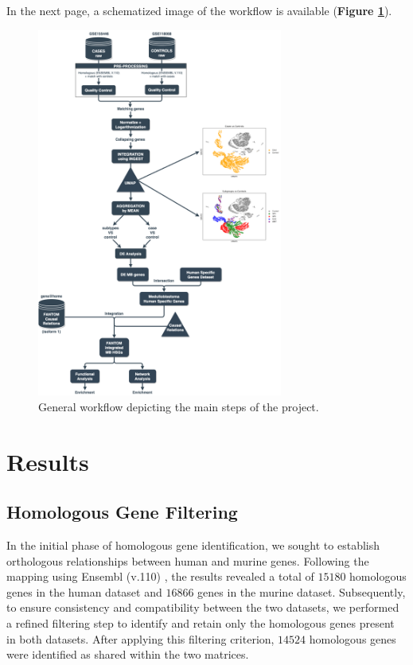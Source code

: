 \documentclass[10pt]{SelfArx} %
\begin{document}
In the next page, a schematized image of the workflow is available (\textbf{Figure \ref{fig:pipeline}}).

\newpage

\begin{figure}[h!]
    \centering
    \includegraphics[width=0.72\textwidth]{project-report/figures/pipeline.png}
    \caption{General workflow depicting the main steps of the project.}
    \label{fig:pipeline}    
\end{figure}

\newpage
\section{Results}\label{sec:results}
\subsection{Homologous Gene Filtering}\label{sec:homologous_results}
In the initial phase of homologous gene identification, we sought to establish orthologous relationships between human and murine genes. Following the mapping using Ensembl (v.110) \cite{biomart_ensembl110}, the results revealed a total of $15180$ homologous genes in the human dataset and $16866$ genes in the murine dataset.
Subsequently, to ensure consistency and compatibility between the two datasets, we performed a refined filtering step to identify and retain only the homologous genes present in both datasets. After applying this filtering criterion, $14524$ homologous genes were identified as shared within the two matrices. 
\end{document}
